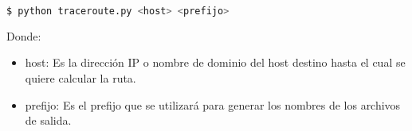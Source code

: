 \begin{lstlisting}[language=bash]
  $ python traceroute.py <host> <prefijo>
\end{lstlisting}

Donde:

\begin{itemize}
\item host: Es la dirección IP o nombre de dominio del host destino hasta el cual se quiere calcular la ruta.
\item prefijo: Es el prefijo que se utilizará para generar los nombres de los archivos de salida.
\end{itemize}